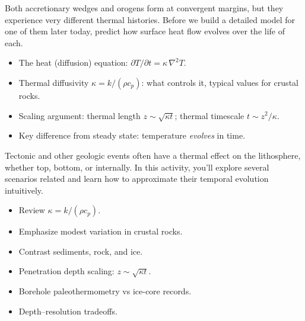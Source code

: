 
Both accretionary wedges and orogens form at convergent margins, but they experience very different thermal histories. Before we build a detailed model for one of them later today, predict how surface heat flow evolves over the life of each.


\begin{itemize}
  \item The heat (diffusion) equation: $\partial T/\partial t = \kappa\, \nabla^2 T$.
  \item Thermal diffusivity $\kappa = k/(\rho c_p)$: what controls it, typical values for crustal rocks.
  \item Scaling argument: thermal length $z \sim \sqrt{\kappa t}$; thermal timescale $t \sim z^2/\kappa$.
  \item Key difference from steady state: temperature \emph{evolves} in time.
\end{itemize}


Tectonic and other geologic events often have a thermal effect on the lithosphere, whether top, bottom, or internally.  In this activity, you'll explore several scenarios related and learn how to approximate their temporal evolution intuitively.


\begin{itemize}
  \item Review $\kappa = k / (\rho c_p)$.
  \item Emphasize modest variation in crustal rocks.
  \item Contrast sediments, rock, and ice.
  \item Penetration depth scaling: $z \sim \sqrt{\kappa t}$.
  \item Borehole paleothermometry vs ice-core records.
  \item Depth--resolution tradeoffs.
\end{itemize}


